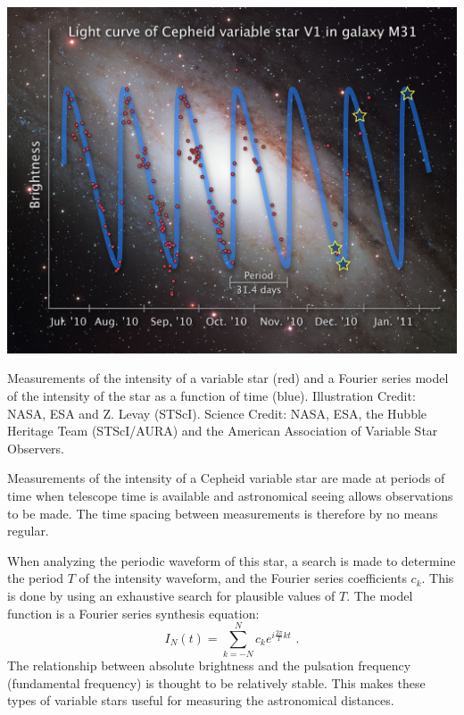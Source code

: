 \begin{marginfigure}
\begin{center}
\includegraphics[width=\textwidth]{Applications/figures/ceph.jpg}
\end{center}
\caption{Measurements of the intensity of a variable star (red) and a Fourier series model of the intensity of the star as a function of time (blue). Illustration Credit: NASA, ESA and Z. Levay (STScI). Science Credit: NASA, ESA, the Hubble Heritage Team (STScI/AURA) and the American Association of Variable Star Observers.}
\label{fig:cepheid_lightcurve}
\end{marginfigure}

Measurements of the intensity of a Cepheid variable star are made at
periods of time when telescope time is available and astronomical
seeing allows observations to be made. The time spacing between
measurements is therefore by no means regular.

When analyzing the periodic waveform of this star, a search is made to
determine the period $T$ of the intensity waveform, and the Fourier
series coefficients $c_k$. This is done by using an exhaustive search
for plausible values of $T$. The model function is a Fourier series
synthesis equation:
\begin{equation}
I_N(t) = \sum_{k=-N}^N c_k e^{i\frac{2\pi}{T}kt} \,\,.
\end{equation}
The relationship between absolute brightness and the pulsation
frequency (fundamental frequency) is thought to be relatively
stable. This makes these types of variable stars useful for measuring
the astronomical distances.



